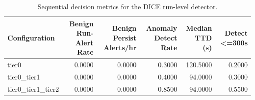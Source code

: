 \begin{table}[t]
\centering
\caption{Sequential decision metrics for the DICE run-level detector.}
\label{tab:dice_sequential_metrics}
\footnotesize
\begin{tabular}{lrrrrr}
\toprule
Configuration & Benign Run-Alert Rate & Benign Persist Alerts/hr & Anomaly Detect Rate & Median TTD (s) & Detect <=300s \\
\midrule
tier0 & 0.0000 & 0.0000 & 0.3000 & 120.5000 & 0.2000 \\
tier0_tier1 & 0.0000 & 0.0000 & 0.4000 & 94.0000 & 0.3000 \\
tier0_tier1_tier2 & 0.0000 & 0.0000 & 0.8500 & 94.0000 & 0.5500 \\
\bottomrule
\end{tabular}

\end{table}
